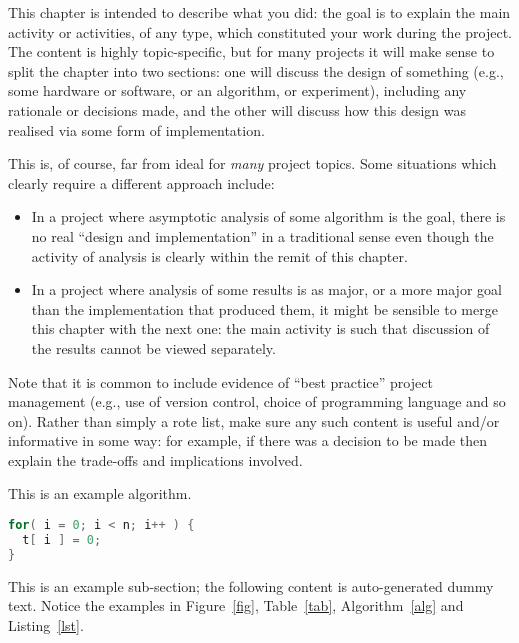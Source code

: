 \documentclass[oneside,%
                    author={Malak Hajji},
                    degree={BSc},
                    title={Designing An Accessible Computational Toolkit For Students},
                  subtitle={With Mixed Visual Abilities}]{dissertation}
\begin{document}
\noindent
This chapter is intended to describe what you did: the goal is to explain
the main activity or activities, of any type, which constituted your work 
during the project.  The content is highly topic-specific, but for many 
projects it will make sense to split the chapter into two sections: one 
will discuss the design of something (e.g., some hardware or software, or 
an algorithm, or experiment), including any rationale or decisions made, 
and the other will discuss how this design was realised via some form of 
implementation.  

This is, of course, far from ideal for {\em many} project topics.  Some
situations which clearly require a different approach include:

\begin{itemize}
\item In a project where asymptotic analysis of some algorithm is the goal,
      there is no real ``design and implementation'' in a traditional sense
      even though the activity of analysis is clearly within the remit of
      this chapter.
\item In a project where analysis of some results is as major, or a more
      major goal than the implementation that produced them, it might be
      sensible to merge this chapter with the next one: the main activity 
      is such that discussion of the results cannot be viewed separately.
\end{itemize}

\noindent
Note that it is common to include evidence of ``best practice'' project 
management (e.g., use of version control, choice of programming language 
and so on).  Rather than simply a rote list, make sure any such content 
is useful and/or informative in some way: for example, if there was a 
decision to be made then explain the trade-offs and implications 
involved.


\begin{algorithm}[t]
\caption{This is an example algorithm.}
\label{alg}
\end{algorithm}

\begin{lstlisting}[float={t},caption={This is an example listing.},label={lst},language=C]
for( i = 0; i < n; i++ ) {
  t[ i ] = 0;
}
\end{lstlisting}

This is an example sub-section;
the following content is auto-generated dummy text.
Notice the examples in Figure~\ref{fig}, Table~\ref{tab}, Algorithm~\ref{alg}
and Listing~\ref{lst}.
\lipsum
\end{document}
